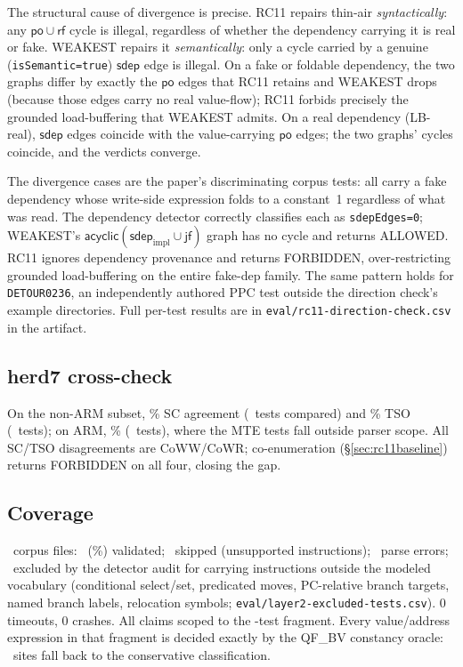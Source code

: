 \documentclass{llncs}
\newcommand{\sdep}{\mathsf{sdep}}
\newcommand{\rf}{\mathsf{rf}}
\newcommand{\jf}{\mathsf{jf}}
\newcommand{\po}{\mathsf{po}}
\newcommand{\sdepimpl}{\mathsf{sdep}_{\mathrm{impl}}}
\begin{document}
The structural cause of divergence is precise. RC11 repairs thin-air
\emph{syntactically}: any $\po \cup \rf$ cycle is illegal, regardless
of whether the dependency carrying it is real or fake. WEAKEST repairs
it \emph{semantically}: only a cycle carried by a genuine
(\texttt{isSemantic=true}) $\sdep$ edge is illegal. On a fake or
foldable dependency, the two graphs differ by exactly the $\po$ edges
that RC11 retains and WEAKEST drops (because those edges carry no real
value-flow); RC11 forbids precisely the grounded load-buffering that
WEAKEST admits. On a real dependency (LB-real), $\sdep$ edges coincide
with the value-carrying $\po$ edges; the two graphs' cycles coincide,
and the verdicts converge.

The divergence cases are the paper's discriminating corpus tests: all
carry a fake dependency whose write-side expression folds to a
constant~1 regardless of what was read. The dependency detector
correctly classifies each as \texttt{sdepEdges=0}; WEAKEST's
$\mathsf{acyclic}(\sdepimpl \cup \jf)$ graph has no cycle and returns
ALLOWED. RC11 ignores dependency provenance and returns FORBIDDEN,
over-restricting grounded load-buffering on the entire fake-dep family.
The same pattern holds for \texttt{DETOUR0236}, an independently
authored PPC test outside the direction check's example directories.
Full per-test results are in \texttt{eval/rc11-direction-check.csv} in
the artifact.

\subsection{herd7 cross-check}
\label{sec:herd7}

On the non-ARM subset, \HerdNonArmSCPercent\% SC agreement
(\HerdNonArmSCCompared~tests compared) and \HerdNonArmTSOPercent\% TSO
(\HerdNonArmTSOCompared~tests); on ARM, \HerdArmSCPercent\%
(\HerdArmSCCompared~tests), where the MTE tests fall outside parser scope.
All SC/TSO disagreements are CoWW/CoWR; co-enumeration
(\S\ref{sec:rc11baseline}) returns FORBIDDEN on all four, closing the gap.

\subsection{Coverage}
\label{sec:coverage}

\CorpusFilesTotal~corpus files: \CorpusSize~(\CoveragePercent\%) validated;
\SkippedUnsupported~skipped (unsupported instructions); \ParseErrors~parse
errors; \ExcludedUnmodeled~excluded by the detector audit for carrying
instructions outside the modeled vocabulary (conditional select/set,
predicated moves, PC-relative branch targets, named branch labels,
relocation symbols; \texttt{eval/layer2-excluded-tests.csv}). 0 timeouts,
0 crashes. All claims scoped to the \CorpusSize-test fragment. Every
value/address expression in that fragment is decided exactly by the QF\_BV
constancy oracle: \LayerTwoSites~sites fall back to the conservative
classification.
\end{document}
